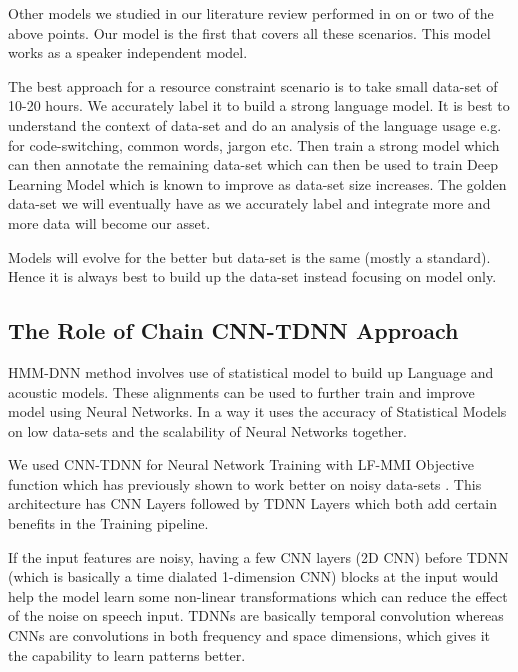 Other models we studied in our literature review performed in on or two of the above points. Our model is the first that covers all these scenarios. This model works as a speaker independent model.

The best approach for a resource constraint scenario is to take small data-set of 10-20 hours. We accurately label it to build a strong language model. It is best to understand the context of data-set and do an analysis of the language usage e.g. for code-switching, common words, jargon etc. Then train a strong model which can then annotate the remaining data-set which can then be used to train Deep Learning Model which is known to improve as data-set size increases. The golden data-set we will eventually have as we accurately label and integrate more and more data will become our asset. 

Models will evolve for the better but data-set is the same (mostly a standard). Hence it is always best to build up the data-set instead focusing on model only.

\subsection{The Role of Chain CNN-TDNN Approach}
HMM-DNN method involves use of statistical model to build up Language and acoustic models. These alignments can be used to further train and improve model using Neural Networks. In a way it uses the accuracy of Statistical Models on low data-sets and the scalability of Neural Networks together. 

We used CNN-TDNN for Neural Network Training with LF-MMI Objective function which has previously shown to work better on noisy data-sets \cite{daniel_povey_kaldi_nodate}\cite{abdel-hamid_convolutional_2014} \cite{zorila_investigation_2019} \cite{biswas_semi-supervised_2019} \cite{noauthor_tdnn_nodate} \cite{georgescu_kaldi-based_2019} \cite{kreyssig_improved_2018}. This architecture has CNN Layers followed by TDNN Layers which both add certain benefits in the Training pipeline.

If the input features are noisy, having a few CNN layers (2D CNN) before TDNN (which is basically a time dialated 1-dimension CNN) blocks at the input would help the model learn some non-linear transformations which can reduce the effect of the noise on speech input. TDNNs are basically temporal convolution whereas CNNs are convolutions in both frequency and space dimensions, which gives it the capability to learn patterns better.

